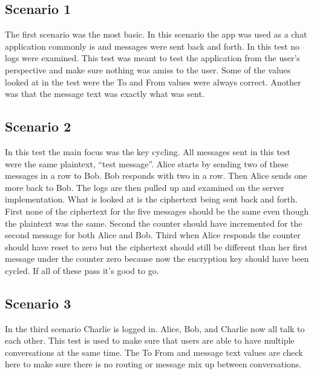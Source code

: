 \subsection{Scenario 1}


The first scenario was the most basic. In this scenario the app was used as a chat application commonly is and messages were sent back and forth. In this test no logs were examined. This test was meant to test the application from the user's perspective and make sure nothing was amiss to the user. Some of the values looked at in the test were the To and From values were always correct. Another was that the message text was exactly what was sent.


\subsection{Scenario 2}


In this test the main focus was the key cycling. All messages sent in this test were the same plaintext, “test message”. Alice starts by sending two of these messages in a row to Bob. Bob responds with two in a row. Then Alice sends one more back to Bob. The logs are then pulled up and examined on the server implementation. What is looked at is the ciphertext being sent back and forth. First none of the ciphertext for the five messages should be the same even though the plaintext was the same. Second the counter should have incremented for the second message for both Alice and Bob. Third when Alice responds the counter should have reset to zero but the ciphertext should still be different than her first message under the counter zero because now the encryption key should have been cycled. If all of these pass it’s good to go.


\subsection{Scenario 3}


In the third scenario Charlie is logged in. Alice, Bob, and Charlie now all talk to each other. This test is used to make sure that users are able to have multiple conversations at the same time. The To From and message text values are check here to make sure there is no routing or message mix up between conversations.



